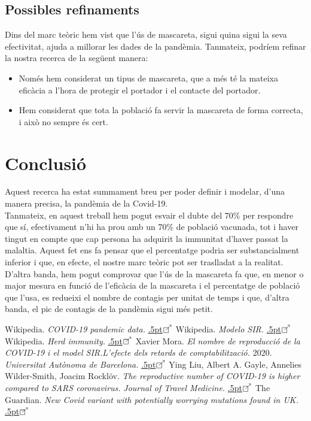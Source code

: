 \documentclass[a4paper, 11pt]{article}
\newcommand\en{\raise.5pt\hbox{$\boxempty\kern-4.85pt{}^{\nearrow}$}\kern-2pt}
\begin{document}
  \subsection{Possibles refinaments}
  Dins del marc teòric hem vist que l'ús de mascareta, sigui quina sigui la seva efectivitat, ajuda a millorar les dades de la pandèmia. Tanmateix, podríem refinar la nostra recerca de la següent manera:
  \begin{itemize}
    \item Només hem considerat un tipus de mascareta, que a més té la mateixa eficàcia a l'hora de protegir el portador i el contacte del portador.
    \item Hem considerat que tota la població fa servir la mascareta de forma correcta, i això no sempre és cert.
  \end{itemize}
\section{Conclusió}
  Aquest recerca ha estat summament breu per poder definir i modelar, d'una manera precisa, la pandèmia de la Covid-19.\\
  Tanmateix, en aquest treball hem pogut esvair el dubte del 70\% per respondre que sí, efectivament n'hi ha prou amb un 70\% de població vacunada, tot i haver tingut en compte que cap persona ha adquirit la immunitat d'haver passat la malaltia. Aquest fet ens fa pensar que el percentatge podria ser substancialment inferior i que, en efecte, el nostre marc teòric pot ser traslladat a la realitat.\\
  D'altra banda, hem pogut comprovar que l'ús de la mascareta fa que, en menor o major mesura en funció de l'eficàcia de la mascareta i el percentatge de població que l'usa, es redueixi el nombre de contagis per unitat de temps i que, d'altra banda, el pic de contagis de la pandèmia sigui més petit.
\begin{thebibliography}{99}
  Wikipedia. \textsl{COVID-19 pandemic data.} \href{https://en.wikipedia.org/wiki/Template:COVID-19_pandemic_data}{\en}
  Wikipedia. \textsl{Modelo SIR.} \href{https://es.wikipedia.org/wiki/Modelo_SIR}{\en}
  Wikipedia. \textsl{Herd immunity.} \href{https://en.wikipedia.org/wiki/Herd_immunity}{\en}
  Xavier Mora. \textsl{El nombre de reproducció de la COVID-19 i el model SIR.\@ L'efecte dels retards de comptabilització.} 2020. \textit{Universitat Autònoma de Barcelona.} \href{https://mat.uab.cat/web/matmat/wp-content/uploads/sites/23/2020/06/v2020n02.pdf}{\en}
  Ying Liu, Albert A. Gayle, Annelies Wilder-Smith, Joacim Rocklöv. \textsl{The reproductive number of COVID-19 is higher compared to SARS coronavirus.} \textit{Journal of Travel Medicine.} \href{https://www.researchgate.net/publication/339272432_The_reproductive_number_of_COVID-19_is_higher_compared_to_SARS_coronavirus/fulltext/5e724347a6fdcc37caf4cf91/The-reproductive-number-of-COVID-19-is-higher-compared-to-SARS-coronavirus.pdf}{\en}
  The Guardian. \textsl{New Covid variant with potentially worrying mutations found in UK.} \href{https://www.theguardian.com/world/2021/feb/15/32-cases-of-latest-covid-variant-of-concern-found-in-uk}{\en}
\end{thebibliography}
\end{document}
